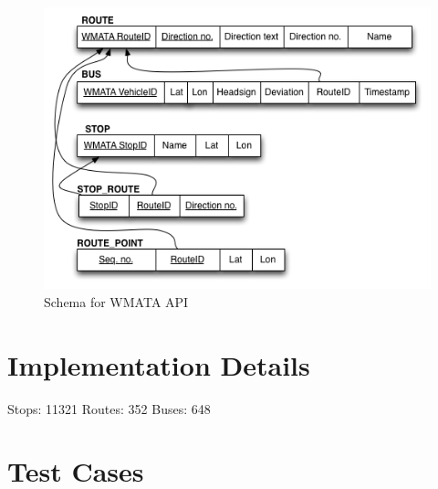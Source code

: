 \documentclass[12pt]{report}
\begin{document}
\begin{figure}[ht]
  \centerline{\includegraphics[scale=0.6]{bus-schema.png}}
  \caption{Schema for WMATA API}
  \label{fig:busSchema}
\end{figure}


\chapter{Implementation Details}

Stops:  11321
Routes: 352
Buses:  648

\chapter{Test Cases}
\end{document}
